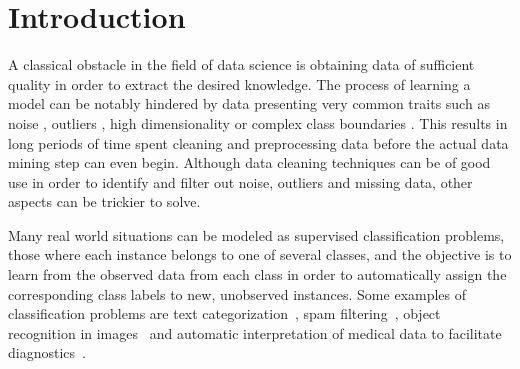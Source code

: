 \section{Introduction}\label{p6sec.intro}

% 
% 
% 

A classical obstacle in the field of data science is obtaining data of sufficient quality in order to extract the desired knowledge. The process of learning a model can be notably hindered by data presenting very common traits such as noise \cite{xiong2006enhancing}, outliers \cite{aggarwal2015outlier}, high dimensionality \cite{AYESHA202044} or complex class boundaries \cite{ho2000measuring}. This results in long periods of time spent cleaning and preprocessing data \cite{garcia2015data} before the actual data mining step can even begin.
Although data cleaning techniques can be of good use in order to identify and filter out noise, outliers and missing data, other aspects can be trickier to solve.

Many real world situations can be modeled as supervised classification problems, those where each instance belongs to one of several classes, and the objective is to learn from the observed data from each class in order to automatically assign the corresponding class labels to new, unobserved instances. Some examples of classification problems are text categorization~\cite{Yang1999ARO}, spam filtering~\cite{Dada2019MachineLF}, object recognition in images~\cite{Russakovsky2015ImageNetLS} and automatic interpretation of medical data to facilitate diagnostics~\cite{deo2015machine}. 

